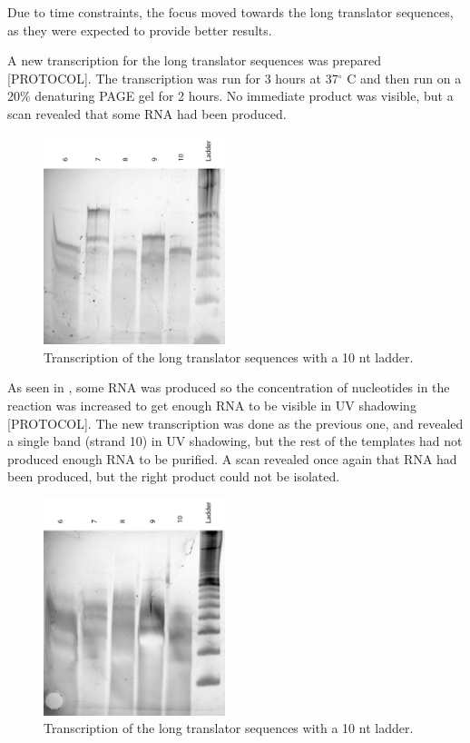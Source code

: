 Due to time constraints, the focus moved towards the long translator sequences, as they were expected to provide better results.

A new transcription for the long translator sequences was prepared [PROTOCOL]. The transcription was run for 3 hours at 37$^\circ$ C and then run on a 20\% denaturing PAGE gel for 2 hours. No immediate product was visible, but a scan revealed that some RNA had been produced.

\begin{figure}[H]
\centering
\includegraphics[width=150pt]{images/translator_transcription_long_1.png}
\caption{Transcription of the long translator sequences with a 10 nt ladder.}
\label{translator_transcription_long_1}
\end{figure}

As seen in , some RNA was produced so the concentration of nucleotides in the reaction was increased to get enough RNA to be visible in UV shadowing [PROTOCOL]. The new transcription was done as the previous one, and revealed a single band (strand 10) in UV shadowing, but the rest of the templates had not produced enough RNA to be purified. A scan revealed once again that RNA had been produced, but the right product could not be isolated.

\begin{figure}[H]
\centering
\includegraphics[width=150pt]{images/translator_transcription_long_2.png}
\caption{Transcription of the long translator sequences with a 10 nt ladder.}
\label{translator_transcription_long_2}
\end{figure}


